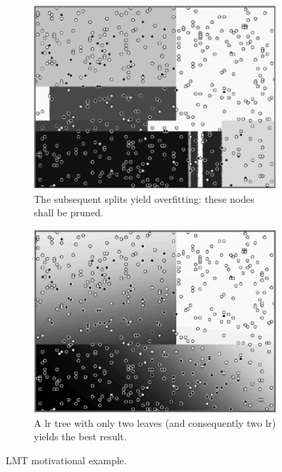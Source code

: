 \begin{figure}[!htb]
\begin{center}
\centering
\begin{subfigure}[t]{0.32\textwidth}
\centering
\includegraphics[width=\textwidth]{figures/chapitre6/lmt_tree_3.png}
\caption{\label{fig:lmt4} The subsequent splits yield overfitting: these nodes shall be pruned.}
\end{subfigure}%
\hspace*{1cm} \begin{subfigure}[t]{0.32\textwidth}
\centering
\includegraphics[width=\textwidth]{figures/chapitre6/lmt_logistic.png}
\caption{\label{fig:lmt5} A \gls{lr} tree with only two leaves (and consequently two \gls{lr}) yields the best result.}
\end{subfigure}
\end{center}

\caption{\label{fig:lmt} LMT motivational example.}
\end{figure}




